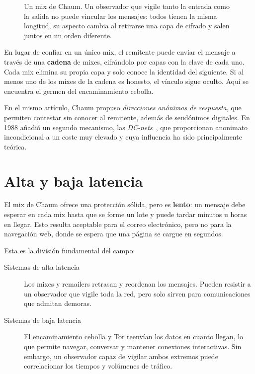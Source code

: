 \begin{figure}[htbp]
\centering

\caption{Un mix de Chaum. Un observador que vigile tanto la entrada como la salida no puede vincular los mensajes: todos tienen la misma longitud, su aspecto cambia al retirarse una capa de cifrado y salen juntos en un orden diferente.}
\label{fig:mix}
\end{figure}

En lugar de confiar en un único mix, el remitente puede enviar el mensaje a través de una \textbf{cadena} de mixes, cifrándolo por capas con la clave de cada uno. Cada mix elimina su propia capa y solo conoce la identidad del siguiente. Si al menos uno de los mixes de la cadena es honesto, el vínculo sigue oculto. Aquí se encuentra el germen del encaminamiento cebolla.

En el mismo artículo, Chaum propuso \emph{direcciones anónimas de respuesta}, que permiten contestar sin conocer al remitente, además de seudónimos digitales. En 1988 añadió un segundo mecanismo, las \emph{DC-nets}~\cite{chaum1988dining}, que proporcionan anonimato incondicional a un coste muy elevado y cuya influencia ha sido principalmente teórica.

\section{Alta y baja latencia}\label{sec:radici-latenza}

El mix de Chaum ofrece una protección sólida, pero es \textbf{lento}: un mensaje debe esperar en cada mix hasta que se forme un lote y puede tardar minutos u horas en llegar. Esto resulta aceptable para el correo electrónico, pero no para la navegación web, donde se espera que una página se cargue en segundos.

Esta es la división fundamental del campo:
\begin{description}
  \item[Sistemas de alta latencia] Los mixes y remailers retrasan y reordenan los mensajes. Pueden resistir a un observador que vigile toda la red, pero solo sirven para comunicaciones que admitan demoras.
  \item[Sistemas de baja latencia] El encaminamiento cebolla y Tor reenvían los datos en cuanto llegan, lo que permite navegar, conversar y mantener conexiones interactivas. Sin embargo, un observador capaz de vigilar ambos extremos puede correlacionar los tiempos y volúmenes de tráfico.
\end{description}

